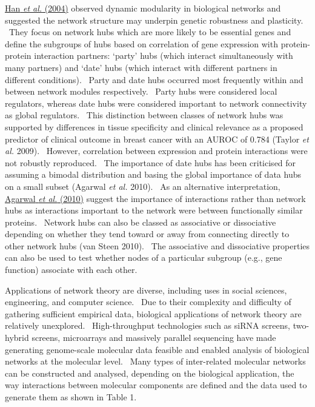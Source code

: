 \hyperlink{ENREF47}{Han}\hyperlink{ENREF47}{\textit{ et
al.}}\hyperlink{ENREF47}{ (2004)} observed dynamic modularity in
biological networks and suggested the network structure may underpin
genetic robustness and plasticity. \ They focus on network hubs which
are more likely to be essential genes and define the subgroups of hubs
based on correlation of gene expression with protein-protein
interaction partners: {\textquoteleft}party{\textquoteright} hubs
(which interact simultaneously with many partners) and
{\textquoteleft}date{\textquoteright} hubs (which interact with
different partners in different conditions). \ Party and date hubs
occurred most frequently within and between network modules
respectively. \ Party hubs were considered local regulators, whereas
date hubs were considered important to network connectivity as global
regulators. \ This distinction between classes of network hubs was
supported by differences in tissue specificity and clinical relevance
as a proposed predictor of clinical outcome in breast cancer with an
AUROC of 0.784 (Taylor\textit{ et al.} 2009). \ However, correlation
between expression and protein interactions were not robustly
reproduced. \ The importance of date hubs has been criticised for
assuming a bimodal distribution and basing the global importance of
data hubs on a small subset (Agarwal\textit{ et al.} 2010). \ As an
alternative interpretation,
\hyperlink{ENREF2}{Agarwal}\hyperlink{ENREF2}{\textit{ et
al.}}\hyperlink{ENREF2}{ (2010)} suggest the importance of interactions
rather than network hubs as interactions important to the network were
between functionally similar proteins. \ Network hubs can also be
classed as associative or dissociative depending on whether they tend
toward or away from connecting directly to other network hubs (van
Steen 2010). \ The associative and dissociative properties can also be
used to test whether nodes of a particular subgroup (e.g., gene
function) associate with each other. \ 

Applications of network theory are diverse, including uses in social
sciences, engineering, and computer science. \ Due to their complexity
and difficulty of gathering sufficient empirical data, biological
applications of network theory are relatively unexplored.
\ High-throughput technologies such as siRNA screens, two-hybrid
screens, microarrays and massively parallel sequencing have made
generating genome-scale molecular data feasible and enabled analysis of
biological networks at the molecular level. \ Many types of
inter-related molecular networks can be constructed and analysed,
depending on the biological application, the way interactions between
molecular components are defined and the data used to generate them as
shown in Table 1. \ 

